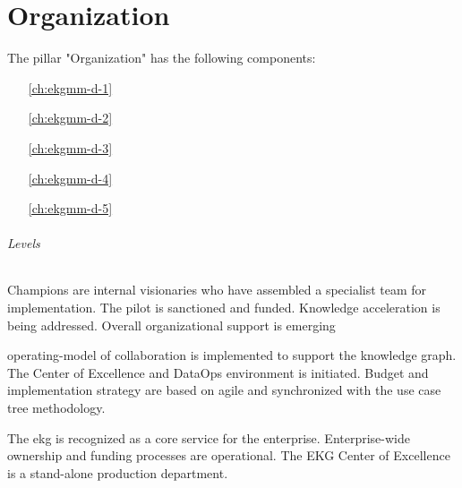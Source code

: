 \part{Organization}\label{pt:ekgmm-d} %

The pillar "Organization" has the following components:

\begin{itemize}[leftmargin=.5in]
    \item [\ref{ch:ekgmm-d-1}] 
    \item [\ref{ch:ekgmm-d-2}] 
    \item [\ref{ch:ekgmm-d-3}] 
    \item [\ref{ch:ekgmm-d-4}] 
    \item [\ref{ch:ekgmm-d-5}] 
\end{itemize}

\paragraph{Levels}

\begin{description}[nosep,font=\bfseries]

    \item [1. \glsfmtshort{ekg} Initiation, \glsfmtshort{mvp}]
    Champions are internal visionaries who have assembled a specialist team for implementation.
    The pilot is sanctioned and funded.
    Knowledge acceleration is being addressed.
    Overall organizational support is emerging

    \item [2. Extensible Platform (reusable components)]
    \Gls{operating-model} of collaboration is implemented to support the knowledge graph.
    The Center of Excellence and DataOps environment is initiated.
    Budget and implementation strategy are based on agile and synchronized with the
    use case tree methodology.

    \item [3. Enterprise Ready]
    The \gls{ekg} is recognized as a core service for the enterprise.
    Enterprise-wide ownership and funding processes are operational.
    The EKG Center of Excellence is a stand-alone production department.

\end{description}





